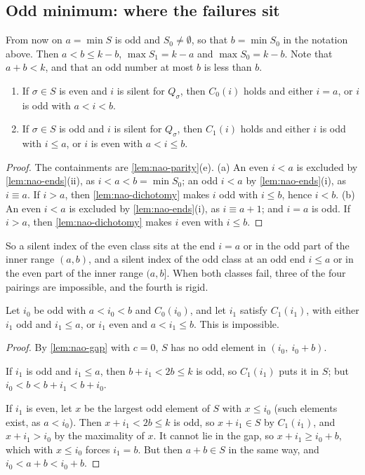 \subsection{Odd minimum: where the failures sit}

From now on $a=\min S$ is odd and $S_0\ne\emptyset$, so that $b=\min S_0$
in the notation above. Then $a<b\le k-b$, $\max S_1=k-a$ and
$\max S_0=k-b$. Note that $a+b<k$, and that an odd number at most $b$
is less than $b$.

\begin{lemma}[localisation]
\label{lem:nao-loc}
\begin{enumerate}
\item[(a)] If $\sigma\in S$ is even and $i$ is silent for $Q_\sigma$, then
$C_0(i)$ holds and either $i=a$, or $i$ is odd with $a<i<b$.
\item[(b)] If $\sigma\in S$ is odd and $i$ is silent for $Q_\sigma$, then
$C_1(i)$ holds and either $i$ is odd with $i\le a$, or $i$ is even with
$a<i\le b$.
\end{enumerate}
\end{lemma}

\begin{proof}
The containments are \autoref{lem:nao-parity}(e). (a) An even $i<a$ is
excluded by \autoref{lem:nao-ends}(ii), as $i<a<b=\min S_0$; an odd $i<a$
by \autoref{lem:nao-ends}(i), as $i\equiv a$. If $i>a$, then
\autoref{lem:nao-dichotomy} makes $i$ odd with $i\le b$, hence $i<b$.
(b) An even $i<a$ is excluded by \autoref{lem:nao-ends}(i), as
$i\equiv a+1$; and $i=a$ is odd. If $i>a$, then \autoref{lem:nao-dichotomy}
makes $i$ even with $i\le b$.
\end{proof}

So a silent index of the even class sits at the end $i=a$ or in the odd part
of the inner range $(a,b)$, and a silent index of the odd class at an odd
end $i\le a$ or in the even part of the inner range $(a,b]$. When both classes fail,
three of the four pairings are impossible, and the fourth is rigid.

\begin{lemma}
\label{lem:nao-noband}
Let $i_0$ be odd with $a<i_0<b$ and $C_0(i_0)$, and let $i_1$ satisfy
$C_1(i_1)$, with either $i_1$ odd and $i_1\le a$, or $i_1$ even and
$a<i_1\le b$. This is impossible.
\end{lemma}

\begin{proof}
By \autoref{lem:nao-gap} with $c=0$, $S$ has no odd element in
$(i_0,\ i_0+b)$.

If $i_1$ is odd and $i_1\le a$, then $b+i_1<2b\le k$ is odd, so $C_1(i_1)$
puts it in $S$; but $i_0<b<b+i_1<b+i_0$.

If $i_1$ is even, let $x$ be the largest odd element of $S$ with $x\le i_0$
(such elements exist, as $a<i_0$). Then $x+i_1<2b\le k$ is odd, so $x+i_1\in
S$ by $C_1(i_1)$, and $x+i_1>i_0$ by the maximality of $x$. It cannot lie in
the gap, so $x+i_1\ge i_0+b$, which with $x\le i_0$ forces $i_1=b$. But
then $a+b\in S$ in the same way, and $i_0<a+b<i_0+b$.
\end{proof}

